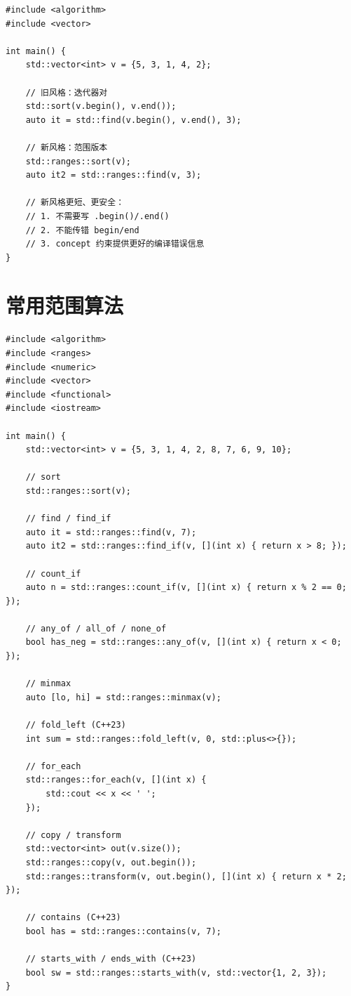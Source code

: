 \documentclass[12pt,a4paper,fontset=fandol]{ctexbook}
\begin{document}
\begin{lstlisting}
#include <algorithm>
#include <vector>

int main() {
    std::vector<int> v = {5, 3, 1, 4, 2};

    // 旧风格：迭代器对
    std::sort(v.begin(), v.end());
    auto it = std::find(v.begin(), v.end(), 3);

    // 新风格：范围版本
    std::ranges::sort(v);
    auto it2 = std::ranges::find(v, 3);

    // 新风格更短、更安全：
    // 1. 不需要写 .begin()/.end()
    // 2. 不能传错 begin/end
    // 3. concept 约束提供更好的编译错误信息
}
\end{lstlisting}

\section{常用范围算法}

\begin{lstlisting}
#include <algorithm>
#include <ranges>
#include <numeric>
#include <vector>
#include <functional>
#include <iostream>

int main() {
    std::vector<int> v = {5, 3, 1, 4, 2, 8, 7, 6, 9, 10};

    // sort
    std::ranges::sort(v);

    // find / find_if
    auto it = std::ranges::find(v, 7);
    auto it2 = std::ranges::find_if(v, [](int x) { return x > 8; });

    // count_if
    auto n = std::ranges::count_if(v, [](int x) { return x % 2 == 0; });

    // any_of / all_of / none_of
    bool has_neg = std::ranges::any_of(v, [](int x) { return x < 0; });

    // minmax
    auto [lo, hi] = std::ranges::minmax(v);

    // fold_left (C++23)
    int sum = std::ranges::fold_left(v, 0, std::plus<>{});

    // for_each
    std::ranges::for_each(v, [](int x) {
        std::cout << x << ' ';
    });

    // copy / transform
    std::vector<int> out(v.size());
    std::ranges::copy(v, out.begin());
    std::ranges::transform(v, out.begin(), [](int x) { return x * 2; });

    // contains (C++23)
    bool has = std::ranges::contains(v, 7);

    // starts_with / ends_with (C++23)
    bool sw = std::ranges::starts_with(v, std::vector{1, 2, 3});
}
\end{lstlisting}
\end{document}
